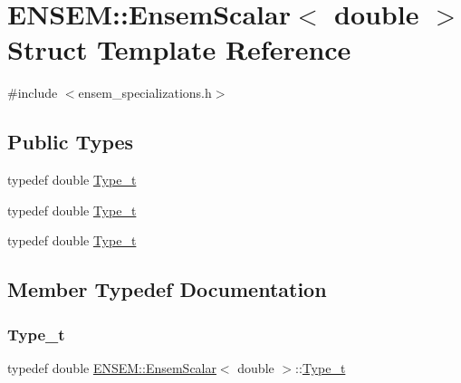 \hypertarget{structENSEM_1_1EnsemScalar_3_01double_01_4}{}\section{E\+N\+S\+EM\+:\+:Ensem\+Scalar$<$ double $>$ Struct Template Reference}
\label{structENSEM_1_1EnsemScalar_3_01double_01_4}


{\ttfamily \#include $<$ensem\+\_\+specializations.\+h$>$}

\subsection*{Public Types}
\begin{DoxyCompactItemize}
\item 
typedef double \mbox{\hyperlink{structENSEM_1_1EnsemScalar_3_01double_01_4_a4f1860ca5dda43a72f79631b986d414e}{Type\+\_\+t}}
\item 
typedef double \mbox{\hyperlink{structENSEM_1_1EnsemScalar_3_01double_01_4_a4f1860ca5dda43a72f79631b986d414e}{Type\+\_\+t}}
\item 
typedef double \mbox{\hyperlink{structENSEM_1_1EnsemScalar_3_01double_01_4_a4f1860ca5dda43a72f79631b986d414e}{Type\+\_\+t}}
\end{DoxyCompactItemize}


\subsection{Member Typedef Documentation}
\mbox{\label{structENSEM_1_1EnsemScalar_3_01double_01_4_a4f1860ca5dda43a72f79631b986d414e}} 
\subsubsection{\texorpdfstring{Type\_t}{Type\_t}\hspace{0.1cm}{\footnotesize\ttfamily [1/3]}}
{\footnotesize\ttfamily typedef double \mbox{\hyperlink{structENSEM_1_1EnsemScalar}{E\+N\+S\+E\+M\+::\+Ensem\+Scalar}}$<$ double $>$\+::\mbox{\hyperlink{structENSEM_1_1EnsemScalar_3_01double_01_4_a4f1860ca5dda43a72f79631b986d414e}{Type\+\_\+t}}}

\mbox{\label{structENSEM_1_1EnsemScalar_3_01double_01_4_a4f1860ca5dda43a72f79631b986d414e}} 
